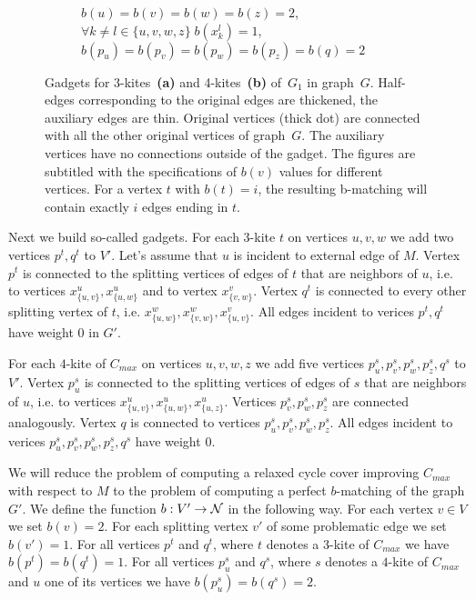 \documentclass[a4, 11pt]{article}
\newcommand{\<}{\langle}
\renewcommand{\>}{\rangle}
\begin{document}
\begin{figure}[h!]
\begin{subfigure}{.48\textwidth}
  \caption{$b(u) = b(v) = b(w) = b(z) = 2$, $\forall k \neq l \in \{u,v,w,z\}\;
  b(x_k^l) = 1$, $b(p_u) = b(p_v) = b(p_w) = b(p_z) = b(q) = 2$}
\end{subfigure}

    \caption{Gadgets for 3-kites~\textbf{(a)} and
    4-kites~\textbf{(b)} of~$G_1$ in graph~$G$. Half-edges corresponding to the
    original edges are thickened, the auxiliary edges are thin. Original
    vertices (thick dot) are connected with all the other original vertices of
    graph~$G$. The auxiliary vertices have no connections outside of the gadget.
    The figures are subtitled with the specifications of $b(v)$ values for
    different vertices. For a vertex $t$ with $b(t) = i$, the resulting
    b-matching will contain exactly $i$ edges ending in $t$.}
    \label{fig:maxtsp_gadgets}
\end{figure}

Next we build so-called gadgets.
For each $3$-kite $t$ on vertices $u,v,w$ we add two vertices $p^t, q^t$ to $V'$. Let's assume that $u$ is incident to external edge of $M$.  Vertex $p^t$ is connected to the splitting vertices of edges of $t$ that are neighbors of $u$, i.e. to vertices $x_{\{u,v\}}^u, x_{\{u,w\}}^u$ and to vertex $x_{\{v,w\}}^v$.  Vertex $q^t$ is connected to every other splitting vertex of $t$, i.e. $x_{\{u,w\}}^w, x_{\{v,w\}}^w, x_{\{u,v\}}^v$. All edges incident to verices $p^t, q^t$
have weight $0$ in $G'$.

For each $4$-kite of $C_{max}$  on vertices $u,v,w,z$    we add five vertices  $p^s_u, p^s_v, p^s_w, p^s_z, q^s$ to $V'$.  Vertex $p^s_u$ is connected to the splitting vertices of edges of $s$ that are neighbors of $u$, i.e. to vertices $x_{\{u,v\}}^u, x_{\{u,w\}}^u, x_{\{u,z\}}^u$.  Vertices $p^s_v, p^s_w, p^s_z$ are connected analogously. Vertex $q$ is connected to vertices $p^s_u, p^s_v, p^s_w, p^s_z$. All edges incident to verices $p^s_u, p^s_v, p^s_w, p^s_z, q^s$
have weight $0$.


We will reduce the problem of computing a relaxed cycle cover improving $C_{max}$ with respect to $M$ to the problem of computing a perfect $b$-matching of the graph $G'$.
We define the function $b: V' \rightarrow {\cal N}$ in the following way. For each vertex $v \in V$ we set $b(v)=2$. For each splitting vertex $v'$ of some problematic edge we set $b(v')=1$.
For all  vertices $p^t$ and $q^t$, where $t$ denotes a $3$-kite of $C_{max}$ we have $b(p^t)=b(q^t)=1$.
For all  vertices $p^s_u$ and $q^s$, where $s$ denotes a $4$-kite of $C_{max}$ and $u$ one of its vertices we have $b(p^s_u)=b(q^s)=2$.
\end{document}

